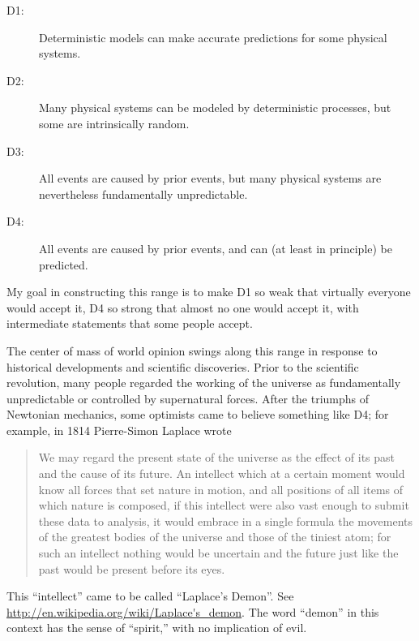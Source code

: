 \documentclass[10pt]{book}
\begin{document}
\begin{description}

\item[D1:] Deterministic models can make accurate predictions
for some physical systems.

\item[D2:] Many physical systems can be modeled by deterministic
processes, but some are intrinsically random.

\item[D3:] All events are caused by prior events, but many
physical systems are nevertheless fundamentally unpredictable.

\item[D4:] All events are caused by prior events, and can (at
least in principle) be predicted.

\end{description}

My goal in constructing this range is to make D1 so weak that
virtually everyone would accept it, D4 so strong that almost no one
would accept it, with intermediate statements that some people accept.

The center of mass of world opinion swings along this range in
response to historical developments and scientific discoveries.  Prior
to the scientific revolution, many people regarded the working of the
universe as fundamentally unpredictable or controlled by supernatural
forces.  After the triumphs of Newtonian mechanics, some optimists
came to believe something like D4; for example, in 1814 Pierre-Simon
Laplace wrote

\begin{quote}
We may regard the present state of the universe as the effect of its
past and the cause of its future. An intellect which at a certain
moment would know all forces that set nature in motion, and all
positions of all items of which nature is composed, if this intellect
were also vast enough to submit these data to analysis, it would
embrace in a single formula the movements of the greatest bodies of
the universe and those of the tiniest atom; for such an intellect
nothing would be uncertain and the future just like the past would be
present before its eyes.
\end{quote}

This ``intellect'' came to be called ``Laplace's Demon''.
See \url{http://en.wikipedia.org/wiki/Laplace's_demon}.  The word
``demon'' in this context has the sense of ``spirit,'' with no
implication of evil.
\end{document}
